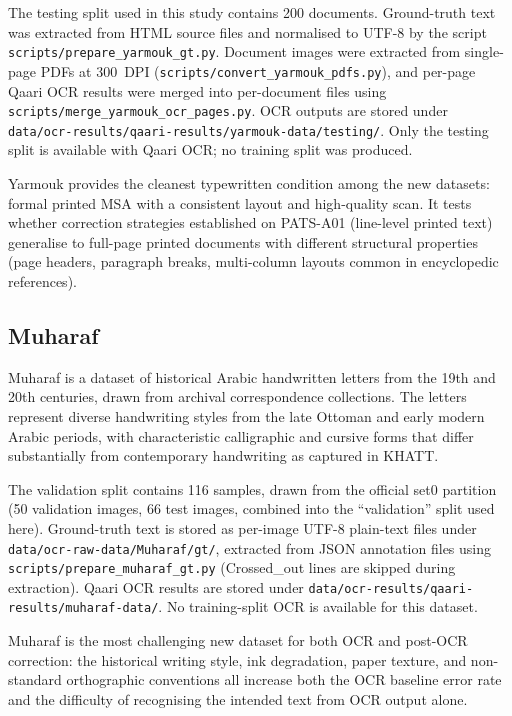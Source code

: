 The testing split used in this study contains 200 documents.
Ground-truth text was extracted from HTML source files and normalised to
UTF-8 by the script \texttt{scripts/prepare\_yarmouk\_gt.py}.
Document images were extracted from single-page PDFs at 300~DPI
(\texttt{scripts/convert\_yarmouk\_pdfs.py}), and per-page Qaari OCR results
were merged into per-document files using
\texttt{scripts/merge\_yarmouk\_ocr\_pages.py}.
OCR outputs are stored under
\texttt{data/ocr-results/qaari-results/yarmouk-data/testing/}.
Only the testing split is available with Qaari OCR; no training split was produced.

Yarmouk provides the cleanest typewritten condition among the new datasets:
formal printed MSA with a consistent layout and high-quality scan.
It tests whether correction strategies established on PATS-A01 (line-level
printed text) generalise to full-page printed documents with different
structural properties (page headers, paragraph breaks, multi-column layouts
common in encyclopedic references).

\subsection{Muharaf}
\label{subsec:muharaf}

Muharaf is a dataset of historical Arabic handwritten letters from the
19th and 20th centuries, drawn from archival correspondence collections.
The letters represent diverse handwriting styles from the late Ottoman and
early modern Arabic periods, with characteristic calligraphic and cursive
forms that differ substantially from contemporary handwriting as captured
in KHATT.

The validation split contains 116 samples, drawn from the official set0
partition (50 validation images, 66 test images, combined into the
``validation'' split used here).
Ground-truth text is stored as per-image UTF-8 plain-text files under
\texttt{data/ocr-raw-data/Muharaf/gt/}, extracted from JSON annotation
files using \texttt{scripts/prepare\_muharaf\_gt.py}
(Crossed\_out lines are skipped during extraction).
Qaari OCR results are stored under
\texttt{data/ocr-results/qaari-results/muharaf-data/}.
No training-split OCR is available for this dataset.

Muharaf is the most challenging new dataset for both OCR and post-OCR
correction: the historical writing style, ink degradation, paper texture,
and non-standard orthographic conventions all increase both the OCR baseline
error rate and the difficulty of recognising the intended text from OCR output
alone.

